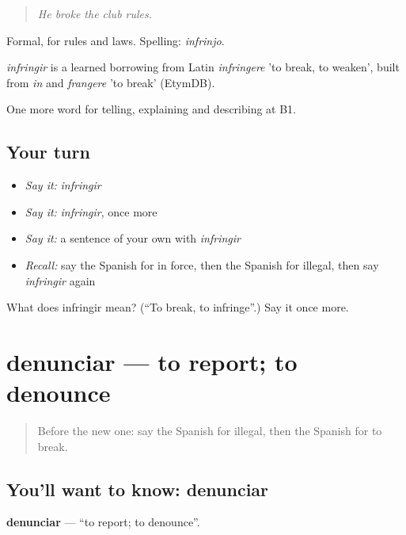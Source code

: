 \begin{quote}
\emph{He broke the club rules.}
\end{quote}

Formal, for rules and laws. Spelling: \emph{infrinjo}.

\begin{cousinweb}
\emph{infringir} is a learned borrowing from Latin \emph{infringere} 'to break, to weaken', built from \emph{in} and \emph{frangere} 'to break' (EtymDB).
\end{cousinweb}

\begin{grammarlens}[title={What you've built}]
One more word for telling, explaining and describing at B1.
\end{grammarlens}

\subsection*{Your turn}
\begin{itemize}
\raggedright
  \item \emph{Say it:} \emph{infringir}
  \item \emph{Say it:} \emph{infringir}, once more
  \item \emph{Say it:} a sentence of your own with \emph{infringir}
  \item \emph{Recall:} say the Spanish for in force, then the Spanish for illegal, then say \emph{infringir} again
\end{itemize}

\begin{tcolorbox}[breakable,colback=teal!4,colframe=teal!35!black,title={Before you move on}]
What does infringir mean? (\textquotedblleft{}To break, to infringe\textquotedblright{}.) Say it once more.
\end{tcolorbox}
\section[denunciar]{denunciar — to report; to denounce}

\label{lesson:ES-C625-denunciar}



\begin{quote}
Before the new one: say the Spanish for illegal, then the Spanish for to break.
\end{quote}

\subsection*{You'll want to know: denunciar}
\textbf{denunciar} — \textquotedblleft{}to report; to denounce\textquotedblright{}.

